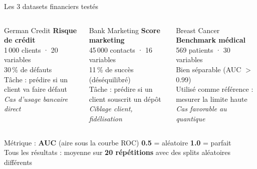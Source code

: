 \documentclass[aspectratio=169]{beamer}
\begin{document}
\begin{frame}{Les 3 datasets financiers testés}
  \begin{columns}[T]
      \begin{block}{German Credit}
        \textbf{Risque de crédit}\\[3pt]
        \small
        1\,000 clients · 20 variables\\
        30\,\% de défauts\\[4pt]
        Tâche : prédire si un\\
        client va faire défaut\\[4pt]
        \textit{Cas d'usage bancaire direct}
      \end{block}

      \begin{block}{Bank Marketing}
        \textbf{Score marketing}\\[3pt]
        \small
        45\,000 contacts · 16 variables\\
        11\,\% de succès (déséquilibré)\\[4pt]
        Tâche : prédire si un\\
        client souscrit un dépôt\\[4pt]
        \textit{Ciblage client, fidélisation}
      \end{block}

      \begin{block}{Breast Cancer}
        \textbf{Benchmark médical}\\[3pt]
        \small
        569 patients · 30 variables\\
        Bien séparable (AUC $>$ 0.99)\\[4pt]
        Utilisé comme référence :\\
        mesurer la limite haute\\[4pt]
        \textit{Cas favorable au quantique}
      \end{block}
  \end{columns}

  \bigskip
  \begin{center}
    \small
    Métrique : \textbf{AUC} (aire sous la courbe ROC)
    \quad \textbf{0.5} = aléatoire \quad \textbf{1.0} = parfait\\
    Tous les résultats : moyenne sur \textbf{20 répétitions}
    avec des splits aléatoires différents
  \end{center}
\end{frame}
\end{document}
